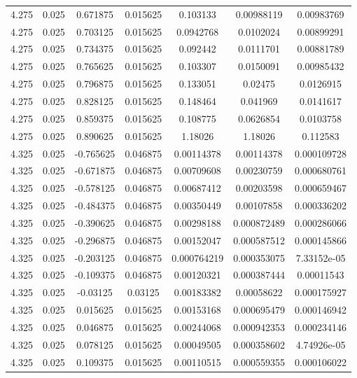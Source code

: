 \begin{table}[bh]
\begin{center}
{\begin{tabular}{ccccccc}
4.275	 & 0.025 & 	0.671875	 & 0.015625	 & 0.103133	 & 0.00988119	 & 0.00983769 \\ 
4.275	 & 0.025 & 	0.703125	 & 0.015625	 & 0.0942768	 & 0.0102024	 & 0.00899291 \\ 
4.275	 & 0.025 & 	0.734375	 & 0.015625	 & 0.092442	 & 0.0111701	 & 0.00881789 \\ 
4.275	 & 0.025 & 	0.765625	 & 0.015625	 & 0.103307	 & 0.0150091	 & 0.00985432 \\ 
4.275	 & 0.025 & 	0.796875	 & 0.015625	 & 0.133051	 & 0.02475	 & 0.0126915 \\ 
4.275	 & 0.025 & 	0.828125	 & 0.015625	 & 0.148464	 & 0.041969	 & 0.0141617 \\ 
4.275	 & 0.025 & 	0.859375	 & 0.015625	 & 0.108775	 & 0.0626854	 & 0.0103758 \\ 
4.275	 & 0.025 & 	0.890625	 & 0.015625	 & 1.18026	 & 1.18026	 & 0.112583 \\ 
4.325	 & 0.025 & 	-0.765625	 & 0.046875	 & 0.00114378	 & 0.00114378	 & 0.000109728 \\ 
4.325	 & 0.025 & 	-0.671875	 & 0.046875	 & 0.00709608	 & 0.00230759	 & 0.000680761 \\ 
4.325	 & 0.025 & 	-0.578125	 & 0.046875	 & 0.00687412	 & 0.00203598	 & 0.000659467 \\ 
4.325	 & 0.025 & 	-0.484375	 & 0.046875	 & 0.00350449	 & 0.00107858	 & 0.000336202 \\ 
4.325	 & 0.025 & 	-0.390625	 & 0.046875	 & 0.00298188	 & 0.000872489	 & 0.000286066 \\ 
4.325	 & 0.025 & 	-0.296875	 & 0.046875	 & 0.00152047	 & 0.000587512	 & 0.000145866 \\ 
4.325	 & 0.025 & 	-0.203125	 & 0.046875	 & 0.000764219	 & 0.000353075	 & 7.33152e-05 \\ 
4.325	 & 0.025 & 	-0.109375	 & 0.046875	 & 0.00120321	 & 0.000387444	 & 0.00011543 \\ 
4.325	 & 0.025 & 	-0.03125	 & 0.03125	 & 0.00183382	 & 0.00058622	 & 0.000175927 \\ 
4.325	 & 0.025 & 	0.015625	 & 0.015625	 & 0.00153168	 & 0.000695479	 & 0.000146942 \\ 
4.325	 & 0.025 & 	0.046875	 & 0.015625	 & 0.00244068	 & 0.000942353	 & 0.000234146 \\ 
4.325	 & 0.025 & 	0.078125	 & 0.015625	 & 0.00049505	 & 0.000358602	 & 4.74926e-05 \\ 
4.325	 & 0.025 & 	0.109375	 & 0.015625	 & 0.00110515	 & 0.000559355	 & 0.000106022 \\ 

\end{tabular}}
\end{center}
\end{table}
